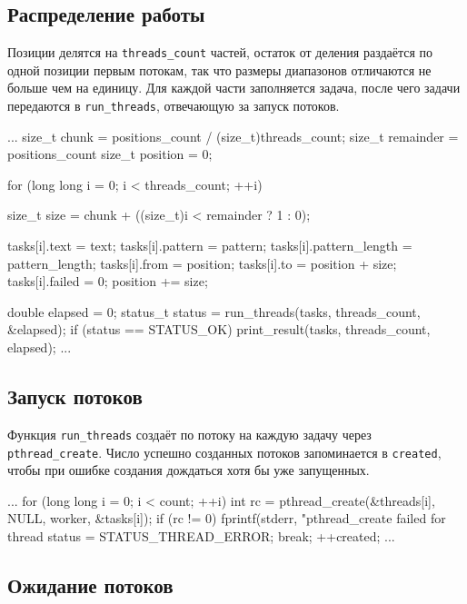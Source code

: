 \documentclass[a4paper,12pt]{article}
\begin{document}
\subsection{Распределение работы}

Позиции делятся на \texttt{threads\_count} частей, остаток от деления раздаётся по одной позиции первым потокам, так что размеры диапазонов отличаются не больше чем на единицу. Для каждой части заполняется задача, после чего задачи передаются в \texttt{run\_threads}, отвечающую за запуск потоков.

\begin{codeblock}
...
size_t chunk = positions_count / (size_t)threads_count;
size_t remainder = positions_count %
size_t position = 0;

for (long long i = 0; i < threads_count; ++i) {
    size_t size = chunk + ((size_t)i < remainder ? 1 : 0);

    tasks[i].text = text;
    tasks[i].pattern = pattern;
    tasks[i].pattern_length = pattern_length;
    tasks[i].from = position;
    tasks[i].to = position + size;
    tasks[i].failed = 0;
    position += size;
}

double elapsed = 0;
status_t status = run_threads(tasks, threads_count, &elapsed);
if (status == STATUS_OK) print_result(tasks, threads_count, elapsed);
...
\end{codeblock}


\subsection{Запуск потоков}

Функция \texttt{run\_threads} создаёт по потоку на каждую задачу через \texttt{pthread\_create}. Число успешно созданных потоков запоминается в \texttt{created}, чтобы при ошибке создания дождаться хотя бы уже запущенных.

\begin{codeblock}
...
for (long long i = 0; i < count; ++i) {
    int rc = pthread_create(&threads[i], NULL, worker, &tasks[i]);
    if (rc != 0) {
        fprintf(stderr, "pthread_create failed for thread %
        status = STATUS_THREAD_ERROR;
        break;
    }
    ++created;
}
...
\end{codeblock}


\subsection{Ожидание потоков}
\end{document}
